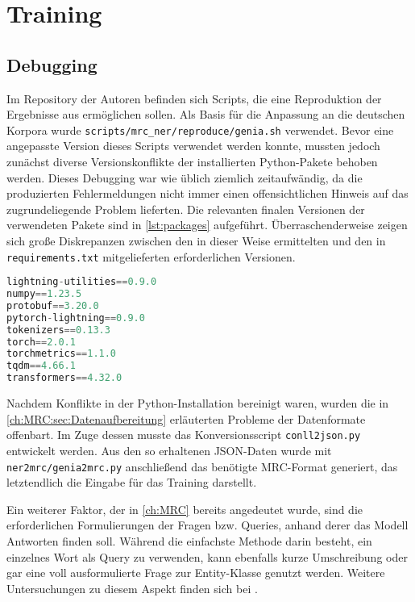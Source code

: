 \chapter{Training}
\label{ch:Training}

\section{Debugging}
\label{ch:Training:sec:Debugging}

Im Repository der Autoren befinden sich Scripts, die eine Reproduktion der Ergebnisse aus \cite{li2019unified} ermöglichen sollen. Als Basis für die Anpassung an die deutschen Korpora wurde \verb|scripts/mrc_ner/reproduce/genia.sh| verwendet. Bevor eine angepasste Version dieses Scripts verwendet werden konnte, mussten jedoch zunächst diverse Versionskonflikte der installierten Python-Pakete behoben werden. Dieses Debugging war wie üblich ziemlich zeitaufwändig, da die produzierten Fehlermeldungen nicht immer einen offensichtlichen Hinweis auf das zugrundeliegende Problem lieferten. Die relevanten finalen Versionen der verwendeten Pakete sind in \autoref{lst:packages} aufgeführt. Überraschenderweise zeigen sich große Diskrepanzen zwischen den in dieser Weise ermittelten und den in \verb|requirements.txt| mitgelieferten erforderlichen Versionen.

\begin{lstlisting}[caption={Liste der verwendeten Pakete}, language={Python}, label={lst:packages}]
lightning-utilities==0.9.0
numpy==1.23.5
protobuf==3.20.0
pytorch-lightning==0.9.0
tokenizers==0.13.3
torch==2.0.1
torchmetrics==1.1.0
tqdm==4.66.1
transformers==4.32.0
\end{lstlisting}

Nachdem Konflikte in der Python-Installation bereinigt waren, wurden die in \autoref{ch:MRC:sec:Datenaufbereitung} erläuterten Probleme der Datenformate offenbart. Im Zuge dessen musste das Konversionsscript \verb|conll2json.py| entwickelt werden. Aus den so erhaltenen JSON-Daten wurde mit \verb|ner2mrc/genia2mrc.py| anschließend das benötigte MRC-Format generiert, das letztendlich die Eingabe für das Training darstellt.

Ein weiterer Faktor, der in \autoref{ch:MRC} bereits angedeutet wurde, sind die erforderlichen Formulierungen der Fragen bzw. Queries, anhand derer das Modell Antworten finden soll. Während die einfachste Methode darin besteht, ein einzelnes Wort als Query zu verwenden, kann ebenfalls kurze Umschreibung oder gar eine voll ausformulierte Frage zur Entity-Klasse genutzt werden. Weitere Untersuchungen zu diesem Aspekt finden sich bei \cite[7]{li2019unified}.

